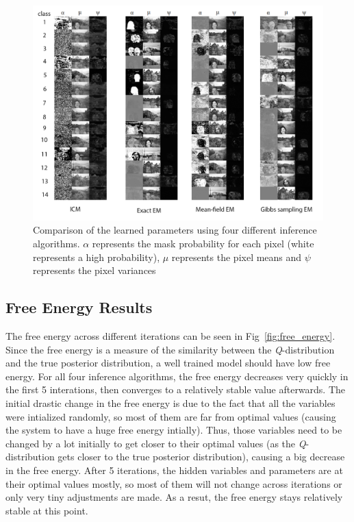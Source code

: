 \documentclass{article} %
\begin{document}
\begin{figure}[h]
\begin{center}
\includegraphics[width=1\textwidth]{final_plot1}
\end{center}
\caption{Comparison of the learned parameters using four different inference algorithms. \textit{$\alpha$} represents the mask probability for each pixel (white represents a high probability),  \textit{$\mu$} represents the pixel means and \textit{$\psi$} represents the pixel variances}
\label{fig:model_com}
\end{figure}

\subsection{Free Energy Results}
\label{free_energy_result}
The free energy across different iterations can be seen in Fig~\ref{fig:free_energy}. Since the free energy is a measure of the similarity between the \textit{Q}-distribution and the true posterior distribution, a well trained model should have low free energy. For all four inference algorithms, the free energy decreases very quickly in the first 5 interations, then converges to a relatively stable value afterwards. The initial drastic change in the free energy is due to the fact that all the variables were intialized randomly, so most of them are far from optimal values (causing the system to have a huge free energy intially). Thus, those variables need to be changed by a lot initially to get closer to their optimal values (as the \textit{Q}-distribution gets closer to the true posterior distribution), causing a big decrease in the free energy. After 5 iterations, the hidden variables and parameters are at their optimal values mostly, so most of them will not change across iterations or only very tiny adjustments are made. As a resut, the free energy stays relatively stable at this point. 
\end{document}
